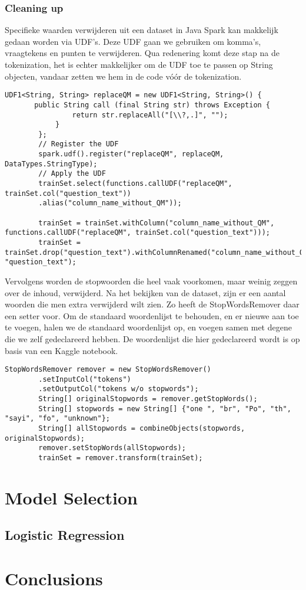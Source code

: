 \subsubsection{Cleaning up}
Specifieke waarden verwijderen uit een dataset in Java Spark kan makkelijk gedaan worden via UDF's. Deze UDF gaan we gebruiken om komma's, vraagtekens en punten te verwijderen. Qua redenering komt deze stap na de tokenization, het is echter makkelijker om de UDF toe te passen op String objecten, vandaar zetten we hem in de code vóór de tokenization.
\begin{lstlisting}[style=codeStyle]
    UDF1<String, String> replaceQM = new UDF1<String, String>() {
       public String call (final String str) throws Exception {
                return str.replaceAll("[\\?,.]", "");
            }
        };
        // Register the UDF
        spark.udf().register("replaceQM", replaceQM, DataTypes.StringType);
        // Apply the UDF
        trainSet.select(functions.callUDF("replaceQM", trainSet.col("question_text"))
        .alias("column_name_without_QM"));
        
        trainSet = trainSet.withColumn("column_name_without_QM", functions.callUDF("replaceQM", trainSet.col("question_text")));
        trainSet = trainSet.drop("question_text").withColumnRenamed("column_name_without_QM", "question_text");
\end{lstlisting}
Vervolgens worden de stopwoorden die heel vaak voorkomen, maar weinig zeggen over de inhoud, verwijderd.
Na het bekijken van de dataset, zijn er een aantal woorden die men extra verwijderd wilt zien. 
Zo heeft de StopWordsRemover daar een setter voor. Om de standaard woordenlijst te behouden, en er nieuwe aan toe te voegen, halen we de standaard woordenlijst op, en voegen samen met degene die we zelf gedeclareerd hebben. De woordenlijst die hier gedeclareerd wordt is op basis van een Kaggle notebook.
\begin{lstlisting}[style=codeStyle]
    StopWordsRemover remover = new StopWordsRemover()
        .setInputCol("tokens")
        .setOutputCol("tokens w/o stopwords");	
        String[] originalStopwords = remover.getStopWords();
        String[] stopwords = new String[] {"one ", "br", "Po", "th", "sayi", "fo", "unknown"};
        String[] allStopwords = combineObjects(stopwords, originalStopwords);
        remover.setStopWords(allStopwords);
        trainSet = remover.transform(trainSet);	
\end{lstlisting} 


\section{Model Selection}
\subsection{Logistic Regression}


\section{Conclusions}
\label{sec:conclusions}

  

